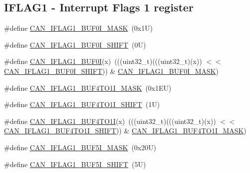 \subsection*{I\+F\+L\+A\+G1 -\/ Interrupt Flags 1 register}
\begin{DoxyCompactItemize}
\item 
\#define \mbox{\hyperlink{group___c_a_n___register___masks_ga5d36a4819a3f3bf511cea99565f3e852}{C\+A\+N\+\_\+\+I\+F\+L\+A\+G1\+\_\+\+B\+U\+F0\+I\+\_\+\+M\+A\+SK}}~(0x1\+U)
\item 
\#define \mbox{\hyperlink{group___c_a_n___register___masks_gae705acf892fbfc2484510abc75a3ef18}{C\+A\+N\+\_\+\+I\+F\+L\+A\+G1\+\_\+\+B\+U\+F0\+I\+\_\+\+S\+H\+I\+FT}}~(0\+U)
\item 
\#define \mbox{\hyperlink{group___c_a_n___register___masks_ga73941b8d3e4d567ed74ece1f8d4958e3}{C\+A\+N\+\_\+\+I\+F\+L\+A\+G1\+\_\+\+B\+U\+F0I}}(x)~(((uint32\+\_\+t)(((uint32\+\_\+t)(x)) $<$$<$ \mbox{\hyperlink{group___c_a_n___register___masks_gae705acf892fbfc2484510abc75a3ef18}{C\+A\+N\+\_\+\+I\+F\+L\+A\+G1\+\_\+\+B\+U\+F0\+I\+\_\+\+S\+H\+I\+FT}})) \& \mbox{\hyperlink{group___c_a_n___register___masks_ga5d36a4819a3f3bf511cea99565f3e852}{C\+A\+N\+\_\+\+I\+F\+L\+A\+G1\+\_\+\+B\+U\+F0\+I\+\_\+\+M\+A\+SK}})
\item 
\#define \mbox{\hyperlink{group___c_a_n___register___masks_ga1ea95efbf4b491b30529894ea5fd1e70}{C\+A\+N\+\_\+\+I\+F\+L\+A\+G1\+\_\+\+B\+U\+F4\+T\+O1\+I\+\_\+\+M\+A\+SK}}~(0x1\+E\+U)
\item 
\#define \mbox{\hyperlink{group___c_a_n___register___masks_ga51d99b1c0de884a6dda6fba3e6826284}{C\+A\+N\+\_\+\+I\+F\+L\+A\+G1\+\_\+\+B\+U\+F4\+T\+O1\+I\+\_\+\+S\+H\+I\+FT}}~(1\+U)
\item 
\#define \mbox{\hyperlink{group___c_a_n___register___masks_ga9e9f76f73c78d9858547491a2ea951b0}{C\+A\+N\+\_\+\+I\+F\+L\+A\+G1\+\_\+\+B\+U\+F4\+T\+O1I}}(x)~(((uint32\+\_\+t)(((uint32\+\_\+t)(x)) $<$$<$ \mbox{\hyperlink{group___c_a_n___register___masks_ga51d99b1c0de884a6dda6fba3e6826284}{C\+A\+N\+\_\+\+I\+F\+L\+A\+G1\+\_\+\+B\+U\+F4\+T\+O1\+I\+\_\+\+S\+H\+I\+FT}})) \& \mbox{\hyperlink{group___c_a_n___register___masks_ga1ea95efbf4b491b30529894ea5fd1e70}{C\+A\+N\+\_\+\+I\+F\+L\+A\+G1\+\_\+\+B\+U\+F4\+T\+O1\+I\+\_\+\+M\+A\+SK}})
\item 
\#define \mbox{\hyperlink{group___c_a_n___register___masks_ga5ba2a22d90a915a0504e74e0be2ae46e}{C\+A\+N\+\_\+\+I\+F\+L\+A\+G1\+\_\+\+B\+U\+F5\+I\+\_\+\+M\+A\+SK}}~(0x20\+U)
\item 
\#define \mbox{\hyperlink{group___c_a_n___register___masks_ga4eef45eb97993797f0e4d25d84ae98ae}{C\+A\+N\+\_\+\+I\+F\+L\+A\+G1\+\_\+\+B\+U\+F5\+I\+\_\+\+S\+H\+I\+FT}}~(5\+U)

\end{DoxyCompactItemize}
